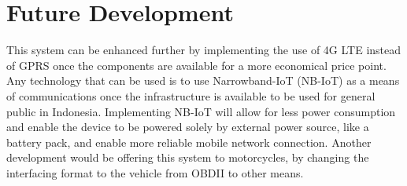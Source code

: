 \documentclass[conference]{IEEEtran}
\begin{document}
\section{Future Development}
This system can be enhanced further by implementing the use of 4G LTE instead of GPRS once the components are available for a more economical price point. Any technology that can be used is to use Narrowband-IoT (NB-IoT) as a means of communications once the infrastructure is available to be used for general public in Indonesia. Implementing NB-IoT will allow for less power consumption and enable the device to be powered solely by external power source, like a battery pack, and enable more reliable 
mobile network connection. Another development would be offering this system to motorcycles, by changing the interfacing format to the vehicle from OBDII to other means.




\end{document}
